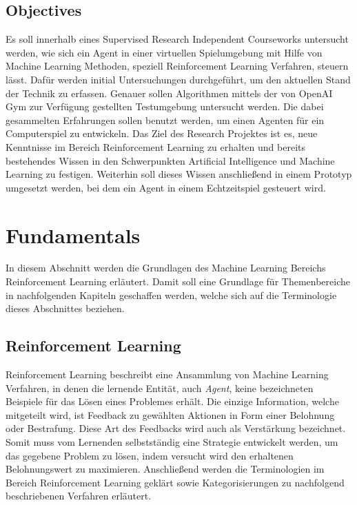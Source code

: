 \documentclass[11pt]{scrartcl}
\begin{document}
\subsection{Objectives}
Es soll innerhalb eines Supervised Research Independent Courseworks untersucht werden, wie
sich ein Agent in einer virtuellen Spielumgebung mit Hilfe von Machine Learning Methoden,
speziell Reinforcement Learning Verfahren, steuern lässt. Dafür werden initial
Untersuchungen durchgeführt, um den aktuellen Stand der Technik zu erfassen. Genauer
sollen Algorithmen mittels der von OpenAI Gym zur Verfügung gestellten Testumgebung
untersucht werden. Die dabei gesammelten Erfahrungen sollen benutzt werden, um einen
Agenten für ein Computerspiel zu entwickeln. Das Ziel des Research Projektes ist es, neue
Kenntnisse im Bereich Reinforcement Learning zu erhalten und bereits bestehendes Wissen in
den Schwerpunkten Artificial Intelligence und Machine Learning zu festigen. Weiterhin soll
dieses Wissen anschließend in einem Prototyp umgesetzt werden, bei dem ein Agent in einem
Echtzeitspiel gesteuert wird.


\newpage
\section{Fundamentals}
In diesem Abschnitt werden die Grundlagen des Machine Learning Bereichs Reinforcement Learning 
erläutert. Damit soll eine Grundlage für Themenbereiche in nachfolgenden Kapiteln geschaffen
werden, welche sich auf die Terminologie dieses Abschnittes beziehen.

\subsection{Reinforcement Learning}
Reinforcement Learning beschreibt eine Ansammlung von Machine Learning Verfahren, in denen die 
lernende Entität, auch \textit{Agent}, keine bezeichneten Beispiele für das Lösen eines Problemes 
erhält. Die einzige Information, welche mitgeteilt wird, ist Feedback zu gewählten Aktionen in Form
einer Belohnung oder Bestrafung. Diese Art des Feedbacks wird auch als Verstärkung bezeichnet.
Somit muss vom Lernenden selbstständig eine Strategie entwickelt werden, um das gegebene
Problem zu lösen, indem versucht wird den erhaltenen Belohnungswert zu maximieren. Anschließend
werden die Terminologien im Bereich Reinforcement Learning geklärt sowie Kategorisierungen zu 
nachfolgend beschriebenen Verfahren erläutert.
\end{document}
